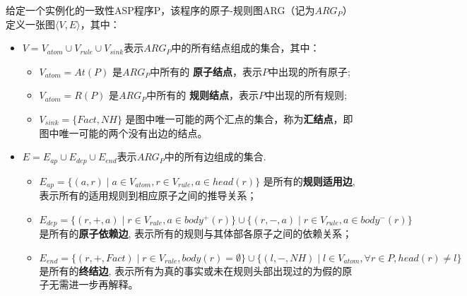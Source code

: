 \begin{definition}[原子-规则图ARG]
    给定一个实例化的一致性ASP程序P，该程序的原子-规则图ARG（记为$ARG_P$）定义一张图$\langle V, E \rangle $，其中：
    \begin{itemize}[topsep=0pt]
      \setlength\itemsep{-0.3em}
      \item $V=V_{atom} \cup V_{rule} \cup V_{sink}$表示$ARG_P$中的所有结点组成的集合，其中：
      \begin{itemize}[label=$\circ$,topsep=0pt]
        \setlength\itemsep{-0.3em}
        \item $V_{atom} = At(P)$ 是$ARG_P$中所有的 \textbf{原子结点}，表示$P$中出现的所有原子;
        \item $V_{atom} = R(P)$ 是$ARG_P$中所有的 \textbf{规则结点}，表示$P$中出现的所有规则;
        \item $V_{sink} = \{Fact, NH\}$ 是图中唯一可能的两个汇点的集合，称为\textbf{汇结点}，即图中唯一可能的两个没有出边的结点。
      \end{itemize}
      \item $E=E_{ap} \cup E_{dep} \cup E_{end}$表示$ARG_P$中的所有边组成的集合.
      \begin{itemize}[label=$\circ$,topsep=0pt]
        \setlength\itemsep{-0.3em}
        \item $E_{ap} = \{(a, r) \mid a \in V_{atom}, r \in V_{rule}, a \in head(r) \}$ 是所有的\textbf{规则适用边}, 表示所有的适用规则到相应原子之间的推导关系；
        \item $E_{dep} = \{(r, +, a) \mid r \in V_{rule}, a \in body^+(r) \} \cup \{(r, -, a) \mid r \in V_{rule}, a \in body^-(r) \}$ 是所有的\textbf{原子依赖边}, 表示所有的规则与其体部各原子之间的依赖关系；
        \item $E_{end}=\{(r, +, Fact) \mid r \in V_{rule}, body(r)=\emptyset\} \cup \{(l, -, NH) \mid l \in V_{atom}, \forall r \in P, head(r) \neq l\}$是所有的\textbf{终结边}, 表示所有为真的事实或未在规则头部出现过的为假的原子无需进一步再解释。
      \end{itemize}
    \end{itemize}
    \end{definition}
